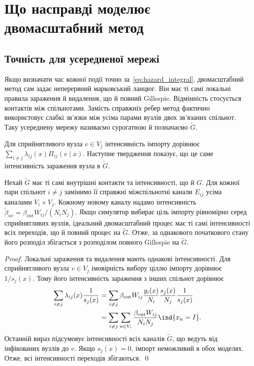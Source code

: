 
\section{Що насправді моделює двомасштабний метод}
\label{sec:analysis}

\subsection{Точність для усередненої мережі}
\label{sec:surrogate}

Якщо визначати час кожної події точно за~\eqref{eq:hazard_integral}, двомасштабний метод сам задає неперервний марковський ланцюг. Він має ті самі локальні правила зараження й видалення, що й повний Gillespie. Відмінність стосується контактів між спільнотами. Замість справжніх ребер метод фактично використовує слабкі зв'язки між усіма парами вузлів двох зв'язаних спільнот. Таку усереднену мережу називаємо сурогатною й позначаємо $\tilde G$.
\par Для сприйнятливого вузла $v\in V_j$ інтенсивність імпорту дорівнює $\sum_{i\neq j}\lambda_{ij}(x)\Pi_{ij}(v\mid x)$. Наступне твердження показує, що це саме інтенсивність зараження вузла в $\tilde G$.

\begin{proposition}
\label{prop:surrogate}
Нехай $\tilde G$ має ті самі внутрішні контакти та інтенсивності, що й $G$. Для кожної пари спільнот $i\neq j$ замінимо її справжні міжспільнотні канали $E_{ij}$ усіма каналами $V_i\times V_j$. Кожному новому каналу надамо інтенсивність $\tilde\beta_{uv}=\beta_{\mathrm{out}}W_{ij}/(N_iN_j)$. Якщо симулятор вибирає ціль імпорту рівномірно серед сприйнятливих вузлів, ідеальний двомасштабний процес має ті самі інтенсивності всіх переходів, що й повний процес на $\tilde G$. Отже, за однакового початкового стану його розподіл збігається з розподілом повного Gillespie на $\tilde G$.
\end{proposition}

\begin{proof}
Локальні зараження та видалення мають однакові інтенсивності. Для сприйнятливого вузла $v\in V_j$ імовірність вибору ціллю імпорту дорівнює $1/s_j(x)$. Тому його інтенсивність зараження з інших спільнот дорівнює
\[
\begin{aligned}
\sum_{i\neq j}\lambda_{ij}(x)\frac{1}{s_j(x)}
&=\sum_{i\neq j}\beta_{\mathrm{out}}W_{ij}\frac{y_i(x)}{N_i}\frac{s_j(x)}{N_j}\frac{1}{s_j(x)}\\
&=\sum_{i\neq j}\sum_{u\in V_i}\frac{\beta_{\mathrm{out}}W_{ij}}{N_iN_j}\ind\{x_u=I\}.
\end{aligned}
\]
Останній вираз підсумовує інтенсивності всіх каналів $\tilde G$, що ведуть від інфікованих вузлів до $v$. Якщо $s_j(x)=0$, імпорт неможливий в обох моделях. Отже, всі інтенсивності переходів збігаються. \qed
\end{proof}

